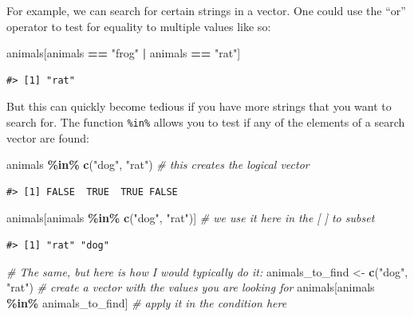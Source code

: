 \documentclass[
]{book}
\newenvironment{Shaded}{\begin{snugshade}}{\end{snugshade}}
\newcommand{\CommentTok}[1]{\textcolor[rgb]{0.56,0.35,0.01}{\textit{#1}}}
\newcommand{\FunctionTok}[1]{\textcolor[rgb]{0.13,0.29,0.53}{\textbf{#1}}}
\newcommand{\NormalTok}[1]{#1}
\newcommand{\OtherTok}[1]{\textcolor[rgb]{0.56,0.35,0.01}{#1}}
\newcommand{\SpecialCharTok}[1]{\textcolor[rgb]{0.81,0.36,0.00}{\textbf{#1}}}
\newcommand{\StringTok}[1]{\textcolor[rgb]{0.31,0.60,0.02}{#1}}
\begin{document}
For example, we can search for certain strings in a vector. One could use the
``or'' operator \texttt{\textbar{}} to test for equality to multiple values like so:

\begin{Shaded}
\begin{Highlighting}[]
\NormalTok{animals[animals }\SpecialCharTok{==} \StringTok{"frog"} \SpecialCharTok{|}\NormalTok{ animals }\SpecialCharTok{==} \StringTok{"rat"}\NormalTok{] }
\end{Highlighting}
\end{Shaded}

\begin{verbatim}
#> [1] "rat"
\end{verbatim}

But this can quickly become tedious if you have more strings that you want to search for. The function \texttt{\%in\%} allows you to test if any of the elements of a search vector are found:

\begin{Shaded}
\begin{Highlighting}[]
\NormalTok{animals }\SpecialCharTok{\%in\%} \FunctionTok{c}\NormalTok{(}\StringTok{"dog"}\NormalTok{, }\StringTok{"rat"}\NormalTok{) }\CommentTok{\# this creates the logical vector}
\end{Highlighting}
\end{Shaded}

\begin{verbatim}
#> [1] FALSE  TRUE  TRUE FALSE
\end{verbatim}

\begin{Shaded}
\begin{Highlighting}[]
\NormalTok{animals[animals }\SpecialCharTok{\%in\%} \FunctionTok{c}\NormalTok{(}\StringTok{"dog"}\NormalTok{, }\StringTok{"rat"}\NormalTok{)] }\CommentTok{\# we use it here in the [ ] to subset}
\end{Highlighting}
\end{Shaded}

\begin{verbatim}
#> [1] "rat" "dog"
\end{verbatim}

\begin{Shaded}
\begin{Highlighting}[]
\CommentTok{\# The same, but here is how I would typically do it:}
\NormalTok{animals\_to\_find }\OtherTok{\textless{}{-}} \FunctionTok{c}\NormalTok{(}\StringTok{"dog"}\NormalTok{, }\StringTok{"rat"}\NormalTok{) }\CommentTok{\# create a vector with the values you are looking for}
\NormalTok{animals[animals }\SpecialCharTok{\%in\%}\NormalTok{ animals\_to\_find] }\CommentTok{\# apply it in the condition here}
\end{Highlighting}
\end{Shaded}
\end{document}

